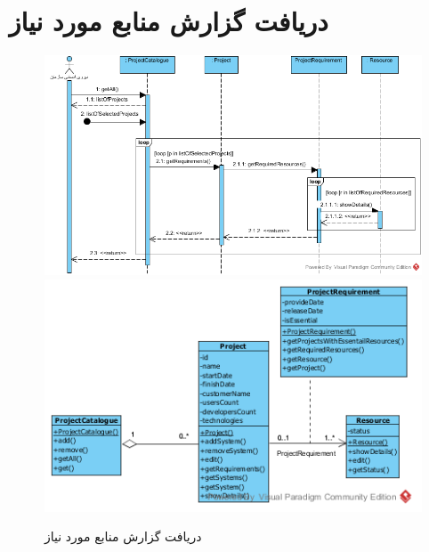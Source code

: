 \section{دریافت گزارش منابع مورد نیاز}
\begin{figure}[H]
	\centering
	\includegraphics[scale=0.7]{img/sequence-analysis/RequiredResourcesReport}
	\includegraphics[scale=0.7]{img/sequence-analysis/RequiredResourcesReportC}
	\caption{دریافت گزارش منابع مورد نیاز}
\end{figure}

